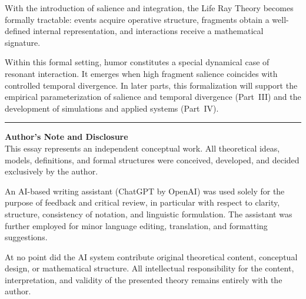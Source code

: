 \documentclass[12pt,a4paper]{article}
\begin{document}
With the introduction of salience and integration,
the Life Ray Theory becomes formally tractable:
events acquire operative structure,
fragments obtain a well-defined internal representation,
and interactions receive a mathematical signature.

Within this formal setting, humor constitutes a special dynamical case
of resonant interaction.
It emerges when high fragment salience coincides with controlled
temporal divergence.
In later parts, this formalization will support
the empirical parameterization of salience and temporal divergence
(Part~III) and the development of simulations and applied systems
(Part~IV).

\vspace{4em}
\noindent\rule{\textwidth}{0.4pt}
\vspace{1em}
\footnotesize
\noindent\textbf{Author’s Note and Disclosure} \\
This essay represents an independent conceptual work. All theoretical ideas, models,
definitions, and formal structures were conceived, developed, and decided exclusively
by the author.

An AI-based writing assistant (ChatGPT by OpenAI) was used solely for the purpose of
feedback and critical review, in particular with respect to clarity, structure,
consistency of notation, and linguistic formulation. The assistant was further employed
for minor language editing, translation, and formatting suggestions.

At no point did the AI system contribute original theoretical content, conceptual
design, or mathematical structure. All intellectual responsibility for the content,
interpretation, and validity of the presented theory remains entirely with the author.

\normalsize
\vspace{2em}

\newpage



\clearpage
{}
{}

\printindex
\end{document}
